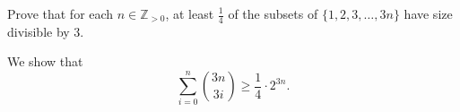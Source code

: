 
\begin{eg}
	Prove that for each \( n \in \mathbb{Z}_{>0} \), at least \( \frac{1}{4}  \) of the subsets of \( \{1, 2, 3, \ldots , 3n\}   \) have size divisible by 3.
\end{eg}
\begin{explanation}
	We show that \[
		\sum_{i=0}^{n} \binom{3n}{3i} \ge \frac{1}{4} \cdot 2^{3n} 
	.\] 
\end{explanation}
